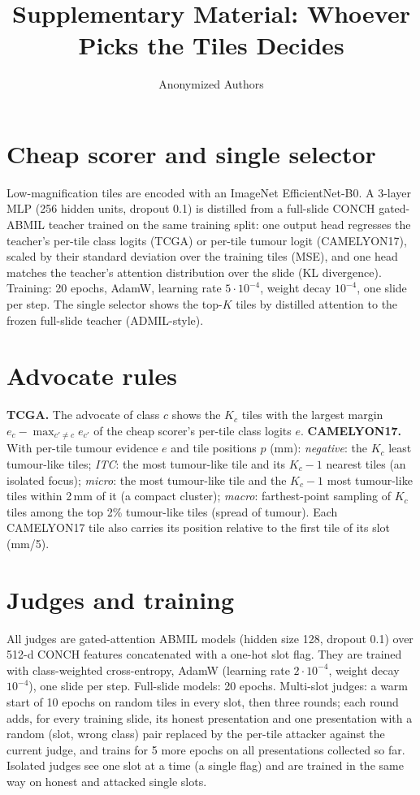 \documentclass[runningheads]{llncs}
\begin{document}
\title{Supplementary Material: Whoever Picks the Tiles Decides}
\author{Anonymized Authors}
\maketitle
\setcounter{section}{0}

\section{Cheap scorer and single selector}
Low-magnification tiles are encoded with an ImageNet EfficientNet-B0. A 3-layer MLP (256 hidden units, dropout 0.1) is distilled from a full-slide CONCH gated-ABMIL teacher trained on the same training split: one output head regresses the teacher's per-tile class logits (TCGA) or per-tile tumour logit (CAMELYON17), scaled by their standard deviation over the training tiles (MSE), and one head matches the teacher's attention distribution over the slide (KL divergence). Training: 20 epochs, AdamW, learning rate $5\cdot10^{-4}$, weight decay $10^{-4}$, one slide per step. The single selector shows the top-$K$ tiles by distilled attention to the frozen full-slide teacher (ADMIL-style).

\section{Advocate rules}
\textbf{TCGA.} The advocate of class $c$ shows the $K_c$ tiles with the largest margin $e_c-\max_{c'\neq c}e_{c'}$ of the cheap scorer's per-tile class logits $e$.
\textbf{CAMELYON17.} With per-tile tumour evidence $e$ and tile positions $p$ (mm): \emph{negative}: the $K_c$ least tumour-like tiles; \emph{ITC}: the most tumour-like tile and its $K_c{-}1$ nearest tiles (an isolated focus); \emph{micro}: the most tumour-like tile and the $K_c{-}1$ most tumour-like tiles within 2\,mm of it (a compact cluster); \emph{macro}: farthest-point sampling of $K_c$ tiles among the top 2\% tumour-like tiles (spread of tumour). Each CAMELYON17 tile also carries its position relative to the first tile of its slot (mm/5).

\section{Judges and training}
All judges are gated-attention ABMIL models (hidden size 128, dropout 0.1) over 512-d CONCH features concatenated with a one-hot slot flag. They are trained with class-weighted cross-entropy, AdamW (learning rate $2\cdot10^{-4}$, weight decay $10^{-4}$), one slide per step. Full-slide models: 20 epochs. Multi-slot judges: a warm start of 10 epochs on random tiles in every slot, then three rounds; each round adds, for every training slide, its honest presentation and one presentation with a random (slot, wrong class) pair replaced by the per-tile attacker against the current judge, and trains for 5 more epochs on all presentations collected so far. Isolated judges see one slot at a time (a single flag) and are trained in the same way on honest and attacked single slots.
\end{document}
